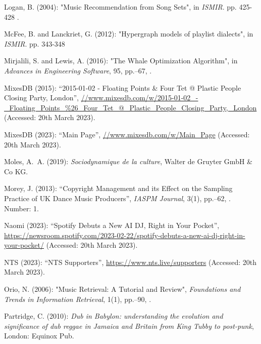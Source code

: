 \documentclass[11pt,titlepage,oneside]{book}
\begin{document}
\begin{thebibliography}{97}
	Logan, B. (2004): "Music {Recommendation} from {Song} {Sets}", in \textit{ISMIR}. pp. 425-428 .
	
	McFee, B. and Lanckriet, G. (2012): "Hypergraph models of playlist dialects", in \textit{ISMIR}. pp. 343-348
	
	Mirjalili, S. and Lewis, A. (2016): "The {Whale} {Optimization}
		{Algorithm}", in \textit{Advances in Engineering Software}, 95, pp.--67, .
	
	MixesDB (2015): \enquote{2015-01-02 - {Floating} {Points} \& {Four} {Tet} @
		{Plastic} {People} {Closing} {Party}, {London}},
	\urlprefix\url{//www.mixesdb.com/w/2015-01-02_-_Floating_Points_%26_Four_Tet_@_Plastic_People_Closing_Party,_London} (Accessed: 20th March 2023).
	
	MixesDB (2023): \enquote{Main {Page}},
	\urlprefix\url{//www.mixesdb.com/w/Main_Page} (Accessed: 20th March 2023).
	
	Moles, A.~A. (2019): \textit{Sociodynamique de la culture}, Walter de Gruyter GmbH \& Co KG.
	
	Morey, J. (2013): \enquote{Copyright {Management} and its {Effect} on the
		{Sampling} {Practice} of {UK} {Dance} {Music} {Producers}}, \textit{IASPM
		Journal}, 3(1), pp.--62, . Number: 1.
	
	Naomi (2023): \enquote{Spotify {Debuts} a {New} {AI} {DJ}, {Right} in {Your}
		{Pocket}},
	\urlprefix\url{https://newsroom.spotify.com/2023-02-22/spotify-debuts-a-new-ai-dj-right-in-your-pocket/} (Accessed: 20th March 2023).
	
	NTS (2023): \enquote{NTS Supporters},
	\urlprefix\url{https://www.nts.live/supporters} (Accessed: 20th March 2023).
	
	Orio, N. (2006): "Music {Retrieval}: {A} {Tutorial} and {Review}",
	\textit{Foundations and Trends in Information Retrieval}, 1(1),
	pp.--90, .
	
	Partridge, C. (2010): \textit{Dub in {Babylon}: understanding the evolution and
		significance of dub reggae in {Jamaica} and {Britain} from {King} {Tubby} to
		post-punk}, London: Equinox Pub.
	

\end{thebibliography}
\end{document}
